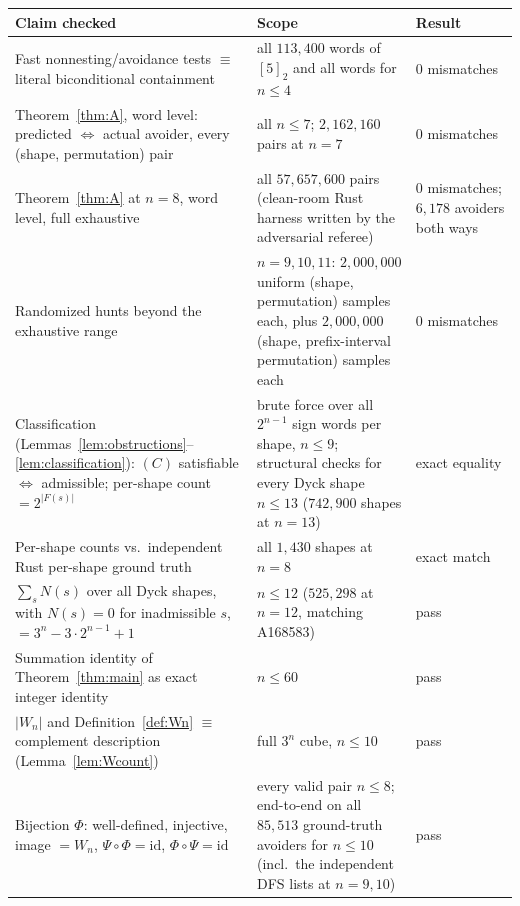 \documentclass[11pt]{article}
\theoremstyle{definition}
\theoremstyle{remark}
\newcommand{\Wn}{W_n}
\begin{document}
\begin{center}
\small
\begin{tabular}{p{}p{}p{}}
\toprule
\textbf{Claim checked} & \textbf{Scope} & \textbf{Result}\\
\midrule
Fast nonnesting/avoidance tests $\equiv$ literal biconditional containment
 & all $113{,}400$ words of $[5]_2$ and all words for $n\le4$
 & $0$ mismatches\\[2pt]
Theorem~\ref{thm:A}, word level: predicted $\iff$ actual avoider, every
(shape, permutation) pair
 & all $n\le7$; $2{,}162{,}160$ pairs at $n=7$
 & $0$ mismatches\\[2pt]
Theorem~\ref{thm:A} at $n=8$, word level, full exhaustive
 & all $57{,}657{,}600$ pairs (clean-room Rust harness written by the
   adversarial referee)
 & $0$ mismatches; $6{,}178$ avoiders both ways\\[2pt]
Randomized hunts beyond the exhaustive range
 & $n=9,10,11$: $2{,}000{,}000$ uniform (shape, permutation) samples each,
   plus $2{,}000{,}000$ (shape, prefix-interval permutation) samples each
 & $0$ mismatches\\[2pt]
Classification (Lemmas~\ref{lem:obstructions}--\ref{lem:classification}):
$(C)$ satisfiable $\iff$ admissible; per-shape count $=2^{|F(s)|}$
 & brute force over all $2^{n-1}$ sign words per shape, $n\le9$; structural
   checks for every Dyck shape $n\le13$ ($742{,}900$ shapes at $n=13$)
 & exact equality\\[2pt]
Per-shape counts vs.\ independent Rust per-shape ground truth
 & all $1{,}430$ shapes at $n=8$
 & exact match\\[2pt]
$\sum_s N(s)$ over all Dyck shapes, with $N(s)=0$ for inadmissible $s$,
$=3^n-3\cdot2^{n-1}+1$
 & $n\le12$ ($525{,}298$ at $n=12$, matching A168583)
 & pass\\[2pt]
Summation identity of Theorem~\ref{thm:main} as exact integer identity
 & $n\le60$
 & pass\\[2pt]
$|\Wn|$ and Definition~\ref{def:Wn} $\equiv$ complement description
(Lemma~\ref{lem:Wcount})
 & full $3^n$ cube, $n\le10$
 & pass\\[2pt]
Bijection $\Phi$: well-defined, injective, image $=\Wn$,
$\Psi\circ\Phi=\mathrm{id}$, $\Phi\circ\Psi=\mathrm{id}$
 & every valid pair $n\le8$; end-to-end on all $85{,}513$ ground-truth
   avoiders for $n\le10$ (incl.\ the independent DFS lists at $n=9,10$)
 & pass\\
\bottomrule
\end{tabular}
\end{center}
\end{document}

